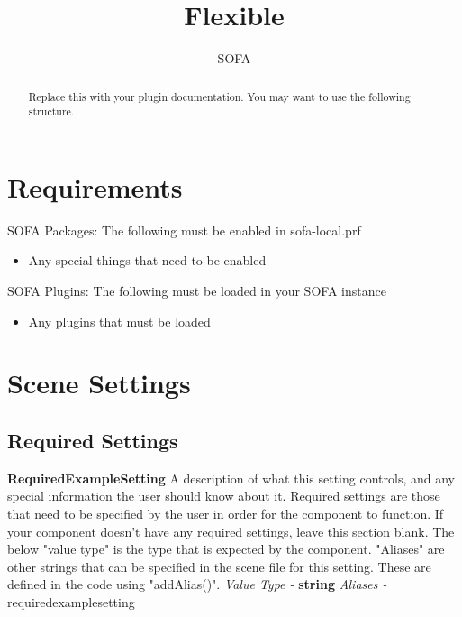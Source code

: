 \documentclass{article}
\newenvironment{componentoption}[1]%
{\textbf{#1}\newline}
{\newline}
\newcommand{\aliases}[1] {\newline \textit{Aliases - } #1}
\newcommand{\valuetype}[1] {\newline \textit{Value Type - } \textbf{#1}}
\begin{document}
\raggedright

\title{Flexible}
\author{SOFA}

\maketitle

\begin{abstract}
Replace this with your plugin documentation. You may want to use the following structure.
\end{abstract}

\section{Requirements}

SOFA Packages:
The following must be enabled in sofa-local.prf
\begin{itemize}
\item Any special things that need to be enabled
\end{itemize}

SOFA Plugins:
The following must be loaded in your SOFA instance
\begin{itemize}
\item Any plugins that must be loaded
\end{itemize}

\section{Scene Settings}

\subsection{Required Settings}

\begin{componentoption}{RequiredExampleSetting}
A description of what this setting controls, and any special information the user should know about it. Required settings are those that need to be specified by the user in order for the component to function. If your component doesn't have any required settings, leave this section blank. The below "value type" is the type that is expected by the component. "Aliases" are other strings that can be specified in the scene file for this setting. These are defined in the code using "addAlias()".
\valuetype{string}
\aliases{requiredexamplesetting}
\end{componentoption}
\end{document}

